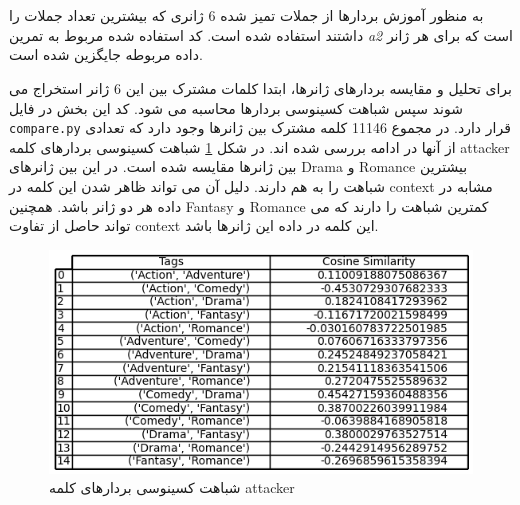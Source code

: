 \section{}
به منظور آموزش بردارها از جملات تمیز شده 6 ژانری که بیشترین تعداد جملات را داشتند استفاده شده است. کد استفاده شده مربوط به تمرین 
\textit{a2}
است که برای هر ژانر داده مربوطه جایگزین شده است. 

برای تحلیل و مقایسه بردارهای ژانرها، ابتدا کلمات مشترک بین این 6 ژانر استخراج می شوند سپس شباهت کسینوسی بردارها محاسبه می شود. کد این بخش در فایل
\texttt{compare.py}
قرار دارد. در مجموع 11146 کلمه مشترک بین ژانرها وجود دارد که تعدادی از آنها در ادامه بررسی شده اند.
در شکل \ref{fig11} شباهت کسینوسی بردارهای کلمه attacker بین ژانرها مقایسه شده است. در این بین ژانرهای
Drama
و
Romance
بیشترین شباهت را به هم دارند. دلیل آن می تواند ظاهر شدن این کلمه در context مشابه در داده هر دو ژانر باشد. همچنین
Fantasy
و
Romance
کمترین شباهت را دارند که می تواند حاصل از تفاوت context این کلمه در داده این ژانرها باشد. 
 \begin{figure}[H]
	\centering
	
	\includegraphics[width=1\textwidth,height=1\textheight,keepaspectratio]{../report/word2vec/attacker}
	\caption{شباهت کسینوسی بردارهای کلمه attacker}
	\label{fig11}
	
\end{figure} 

